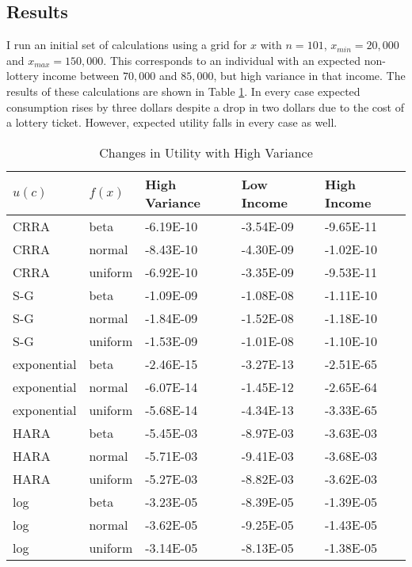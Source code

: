 \documentclass[letterpaper,12pt]{article}
\numberwithin{equation}{section}
\numberwithin{figure}{section}
\numberwithin{table}{section}
\begin{document}
\begin{spacing}{1.5}
\section{Results} \label{sec_results}

	I run an initial set of calculations using a grid for $x$ with $n=101$, $x_{min} = 20,000$ and $x_{max} = 150,000$.  This corresponds to an individual with an expected non-lottery income between $70,000$ and $85,000$, but high variance in that income.  The results of these calculations are shown in Table \ref{tab_lottery1}. In every case expected consumption rises by three dollars despite a drop in two dollars due to the cost of a lottery ticket.  However, expected utility falls in every case as well.

	\begin{table}[ht] 
		\caption{Changes in Utility with High Variance}
		\label{tab_lottery1}
		\centering
		\begin{tabular}{|ll|lll|}
		    \hline
			$u(c)$ & $f(x)$ & High Variance & Low Income & High Income \\
			\hline
			CRRA & beta & -6.19E-10 & -3.54E-09 & -9.65E-11 \\
			CRRA & normal & -8.43E-10 & -4.30E-09 & -1.02E-10 \\
			CRRA & uniform & -6.92E-10 & -3.35E-09 & -9.53E-11 \\
			\hline
			S-G & beta & -1.09E-09 & -1.08E-08 & -1.11E-10 \\
			S-G & normal & -1.84E-09 & -1.52E-08 & -1.18E-10 \\
			S-G & uniform & -1.53E-09 & -1.01E-08 & -1.10E-10 \\
			\hline
			exponential & beta & -2.46E-15 & -3.27E-13 & -2.51E-65 \\
			exponential & normal & -6.07E-14 & -1.45E-12 & -2.65E-64 \\
			exponential & uniform & -5.68E-14 & -4.34E-13 & -3.33E-65 \\
			\hline
			HARA & beta & -5.45E-03 & -8.97E-03 & -3.63E-03 \\
			HARA & normal & -5.71E-03 & -9.41E-03 & -3.68E-03 \\
			HARA & uniform & -5.27E-03 & -8.82E-03 & -3.62E-03 \\
			\hline
			log & beta & -3.23E-05 & -8.39E-05 & -1.39E-05 \\
			log & normal & -3.62E-05 & -9.25E-05 & -1.43E-05 \\
			log & uniform & -3.14E-05 & -8.13E-05 & -1.38E-05 \\
			\hline
		\end{tabular}
	\end{table}


\end{spacing}
\end{document}
